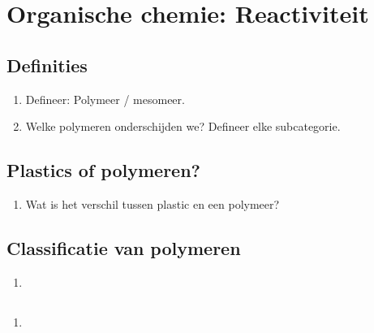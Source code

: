 \documentclass[a4paper,12pt]{article}
\begin{document}
    \maketitle

    \section{Organische chemie: Reactiviteit}
    \subsection*{Definities}
    \begin{enumerate}
        \item Defineer: Polymeer / mesomeer.
        \item Welke polymeren onderschijden we? Defineer elke subcategorie.
    \end{enumerate}
    \subsection*{Plastics of polymeren?}
    \begin{enumerate}
        \item Wat is het verschil tussen plastic en een polymeer?
    \end{enumerate}
    \subsection*{Classificatie van polymeren}
    \begin{enumerate}
        \item 
    \end{enumerate}
    \subsection*{}
    \begin{enumerate}
        \item 
    \end{enumerate}
\end{document}
